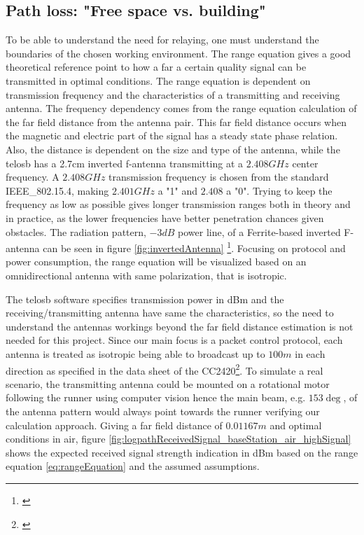 \subsection{Path loss: "Free space vs. building"}\label{sc:pathLoss}

To be able to understand the need for relaying, one must understand the boundaries of the chosen working environment. The range equation gives a good theoretical reference point to how a far a certain quality signal can be transmitted in optimal conditions. The range equation is dependent on transmission frequency and the characteristics of a transmitting and receiving antenna. The frequency dependency comes from the range equation calculation of the far field distance from the antenna pair. This far field distance occurs when the magnetic and electric part of the signal has a steady state phase relation. Also, the distance is dependent on the size and type of the antenna, while the telosb has a 2.7cm inverted f-antenna transmitting at a $2.408GHz$ center frequency. A $2.408GHz$ transmission frequency is chosen from the standard IEEE\_802.15.4, making $2.401GHz$ a "1" and $2.408$ a "0". Trying to keep the frequency as low as possible gives longer transmission ranges both in theory and in practice, as the lower frequencies have better penetration chances given obstacles. The radiation pattern, $-3dB$ power line, of a Ferrite-based inverted F-antenna can be seen in figure \ref{fig:invertedAntenna} \footnote{\cite{Finv}}. Focusing on protocol and power consumption, the range equation will be visualized based on an omnidirectional antenna with same polarization, that is isotropic.

\noindent The telosb software specifies transmission power in dBm and the receiving/transmitting antenna have same the characteristics, so the need to understand the antennas workings beyond the far field distance estimation is not needed for this project. Since our main focus is a packet control protocol, each antenna is treated as isotropic being able to broadcast up to $100m$ in each direction as specified in the data sheet of the CC2420\footnote{\cite{Ieee}}. To simulate a real scenario, the transmitting antenna could be mounted on a rotational motor following the runner using computer vision hence the main beam, e.g. $153\deg$, of the antenna pattern would always point towards the runner verifying our calculation approach. Giving a far field distance of $0.01167m$ and optimal conditions in air, figure \ref{fig:logpathReceivedSignal_baseStation_air_highSignal} shows the expected received signal strength indication in dBm based on the range equation \ref{eq:rangeEquation} and the assumed assumptions. 

